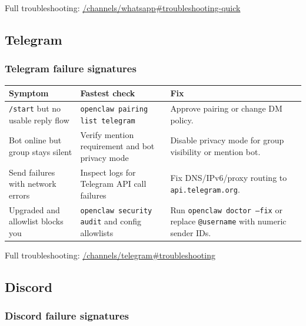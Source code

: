 Full troubleshooting: \href{/channels/whatsapp\#troubleshooting-quick}{/channels/whatsapp\#troubleshooting-quick}

\subsection{Telegram}


\subsubsection{Telegram failure signatures}



\begin{table}[h]
\centering
\small
\begin{tabular}{|l|l|l|}
\hline
Symptom & Fastest check & Fix \\
\hline
\texttt{/start} but no usable reply flow & \texttt{openclaw pairing list telegram} & Approve pairing or change DM policy. \\
\hline
Bot online but group stays silent & Verify mention requirement and bot privacy mode & Disable privacy mode for group visibility or mention bot. \\
\hline
Send failures with network errors & Inspect logs for Telegram API call failures & Fix DNS/IPv6/proxy routing to \texttt{api.telegram.org}. \\
\hline
Upgraded and allowlist blocks you & \texttt{openclaw security audit} and config allowlists & Run \texttt{openclaw doctor --fix} or replace \texttt{@username} with numeric sender IDs. \\
\hline
\end{tabular}
\end{table}



Full troubleshooting: \href{/channels/telegram\#troubleshooting}{/channels/telegram\#troubleshooting}

\subsection{Discord}


\subsubsection{Discord failure signatures}



